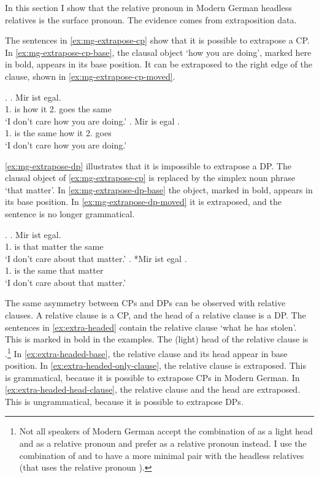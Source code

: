 In this section I show that the relative pronoun in Modern German headless relatives is the surface pronoun. The evidence comes from extraposition data.

The sentences in \ref{ex:mg-extrapose-cp} show that it is possible to extrapose a CP. In \ref{ex:mg-extrapose-cp-base}, the clausal object  `how you are doing', marked here in bold, appears in its base position. It can be extraposed to the right edge of the clause, shown in \ref{ex:mg-extrapose-cp-moved}.

\ex.\label{ex:mg-extrapose-cp}
\ag. Mir ist     egal.\\
1. is how it 2. goes {the same}\\
`I don't care how you are doing.'\label{ex:mg-extrapose-cp-base}
\bg. Mir is egal    .\\
1. is {the same} how it 2. goes\\
`I don't care how you are doing.' \label{ex:mg-extrapose-cp-moved}

\ref{ex:mg-extrapose-dp} illustrates that it is impossible to extrapose a DP. The clausal object of \ref{ex:mg-extrapose-cp} is replaced by the simplex noun phrase  `that matter'.
In \ref{ex:mg-extrapose-dp-base} the object, marked in bold, appears in its base position. In \ref{ex:mg-extrapose-dp-moved} it is extraposed, and the sentence is no longer grammatical.

\ex.\label{ex:mg-extrapose-dp}
\ag. Mir ist   egal.\\
1. is that matter {the same}\\
`I don't care about that matter.'\label{ex:mg-extrapose-dp-base}
\bg. *Mir ist egal  .\\
1. is {the same} that matter\\
`I don't care about that matter.' \label{ex:mg-extrapose-dp-moved}

The same asymmetry between CPs and DPs can be observed with relative clauses. A relative clause is a CP, and the head of a relative clause is a DP. The sentences in \ref{ex:extra-headed} contain the relative clause  `what he has stolen'. This is marked in bold in the examples. The (light) head of the relative clause is .\footnote{
Not all speakers of Modern German accept the combination of  as a light head and  as a relative pronoun and prefer  as a relative pronoun instead. I use the combination of  and  to have a more minimal pair with the headless relatives (that uses the relative pronoun ).
}
In \ref{ex:extra-headed-base}, the relative clause and its head appear in base position. In \ref{ex:extra-headed-only-clause}, the relative clause is extraposed. This is grammatical, because it is possible to extrapose CPs in Modern German. In \ref{ex:extra-headed-head-clause}, the relative clause and the head are extraposed. This is ungrammatical, because it is possible to extrapose DPs.

